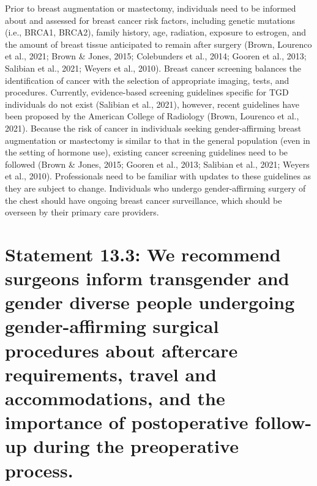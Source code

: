 \documentclass[
]{book}
\begin{document}
Prior to breast augmentation or mastectomy,
individuals need to be informed about and
assessed for breast cancer risk factors, including
genetic mutations (i.e., BRCA1, BRCA2), family
history, age, radiation, exposure to estrogen, and
the amount of breast tissue anticipated to remain
after surgery (Brown, Lourenco et al., 2021;
Brown \& Jones, 2015; Colebunders et al., 2014;
Gooren et al., 2013; Salibian et al., 2021; Weyers
et al., 2010). Breast cancer screening balances the
identification of cancer with the selection of
appropriate imaging, tests, and procedures.
Currently, evidence-based screening guidelines
specific for TGD individuals do not exist (Salibian
et al., 2021), however, recent guidelines have been
proposed by the American College of Radiology
(Brown, Lourenco et al., 2021). Because the risk
of cancer in individuals seeking gender-affirming
breast augmentation or mastectomy is similar to
that in the general population (even in the setting
of hormone use), existing cancer screening guidelines need to be followed (Brown \& Jones, 2015;
Gooren et al., 2013; Salibian et al., 2021; Weyers
et al., 2010). Professionals need to be familiar
with updates to these guidelines as they are subject to change. Individuals who undergo
gender-affirming surgery of the chest should have
ongoing breast cancer surveillance, which should
be overseen by their primary care providers.

\hypertarget{statement-13.3-we-recommend-surgeons-inform-transgender-and-gender-diverse-people-undergoing-gender-affirming-surgical-procedures-about-aftercare-requirements-travel-and-accommodations-and-the-importance-of-postoperative-follow-up-during-the-preoperative-process.}{%
\section*{Statement 13.3: We recommend surgeons inform transgender and gender diverse people undergoing gender-affirming surgical procedures about aftercare requirements, travel and accommodations, and the importance of postoperative follow-up during the preoperative process.}\label{statement-13.3-we-recommend-surgeons-inform-transgender-and-gender-diverse-people-undergoing-gender-affirming-surgical-procedures-about-aftercare-requirements-travel-and-accommodations-and-the-importance-of-postoperative-follow-up-during-the-preoperative-process.}}
\end{document}
